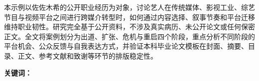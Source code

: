 
本示例以佐佐木希的公开职业经历为对象，讨论艺人在传统媒体、影视工业、综艺节目与视频平台之间进行跨媒介转型时，如何通过内容选择、叙事节奏和平台迁移维持职业韧性。研究完全基于公开资料，不涉及真实病历、未公开论文或任何保密正文。全文将案例划分为出道、扩张、危机与重启四个阶段，重点分析不同阶段的平台机会、公众反馈与自我表达方式，并验证本科毕业论文模板在封面、摘要、目录、正文、参考文献和致谢等环节的排版稳定性。

\vspace{1.6cm}
\noindent\textbf{关键词：}\justKeywordsZh
